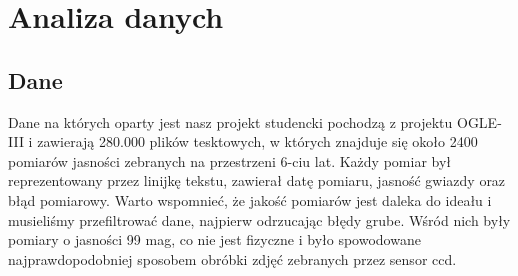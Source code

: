 \documentclass[a4paper,11pt]{article}
\newcommand{\ak}{\hspace{0.7 cm}}
\begin{document}
\section{Analiza danych}
\subsection{Dane}
\ak Dane na których oparty jest nasz projekt studencki pochodzą z projektu OGLE-III i zawierają 280.000 plików tesktowych, w których znajduje się około 2400 pomiarów jasności zebranych na przestrzeni 6-ciu lat. Każdy pomiar był reprezentowany przez linijkę tekstu, zawierał datę pomiaru, jasność gwiazdy oraz błąd pomiarowy. Warto wspomnieć, że jakość pomiarów jest daleka do ideału i musieliśmy przefiltrować dane, najpierw odrzucając błędy grube. Wśród nich były pomiary o jasności 99 mag, co nie jest fizyczne i było spowodowane najprawdopodobniej sposobem obróbki zdjęć zebranych przez sensor ccd.
\end{document}
